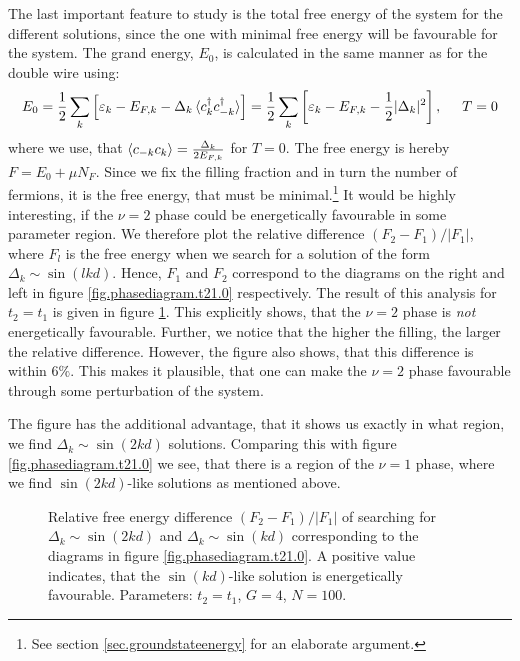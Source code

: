 The last important feature to study is the total free energy of the system for the different solutions, since the one with minimal free energy will be favourable for the system. The grand energy, $E_0$, is calculated in the same manner as for the double wire using:
\begin{equation}
E_0 = \frac{1}{2}\sum_k \left[\varepsilon_k - E_{F,k} - \Delta_k\braket{c^\dagger_{k}c^\dagger_{-k}}\right] = \frac{1}{2}\sum_k \left[\varepsilon_k - E_{F,k} - \frac{1}{2}|\Delta_k|^2\right], \hspace{0.5cm} T = 0
\label{eq.groundstategrandenergy.sumformula}
\end{equation}
where we use, that $\braket{c_{-k}c_k} = \frac{\Delta_k}{2E_{F,k}}$ for $T = 0$. The free energy is hereby $F = E_0 + \mu N_F$. Since we fix the filling fraction and in turn the number of fermions, it is the free energy, that must be minimal.\footnote{See section \ref{sec.groundstateenergy} for an elaborate argument.}  It would be highly interesting, if the $\nu = 2$ phase could be energetically favourable in some parameter region. We therefore plot the relative difference $(F_2 - F_1)/|F_1|$, where $F_l$ is the free energy when we search for a solution of the form $\Delta_k \sim \sin(lkd)$. Hence, $F_1$ and $F_2$ correspond to the diagrams on the right and left in figure \ref{fig.phasediagram.t21.0} respectively. The result of this analysis for $t_2 = t_1$ is given in figure \ref{fig.energydifference.t21.0}. This explicitly shows, that the $\nu = 2$ phase is \textit{not} energetically favourable. Further, we notice that the higher the filling, the larger the relative difference. However, the figure also shows, that this difference is within $6\%$. This makes it plausible, that one can make the $\nu = 2$ phase favourable through some perturbation of the system. 

The figure has the additional advantage, that it shows us exactly in what region, we find $\Delta_k \sim \sin(2kd)$ solutions. Comparing this with figure \ref{fig.phasediagram.t21.0} we see, that there is a region of the $\nu = 1$ phase, where we find $\sin(2kd)$-like solutions as mentioned above. 

\begin{figure}
\begin{center}

\caption{Relative free energy difference $(F_2 - F_1) / |F_1|$ of searching for $\Delta_k \sim \sin(2kd)$ and $\Delta_k\sim \sin(kd)$ corresponding to the diagrams in figure \ref{fig.phasediagram.t21.0}. A positive value indicates, that the $\sin(kd)$-like solution is energetically favourable. Parameters: $t_2 = t_1$, $G = 4$, $N = 100$. }
\label{fig.energydifference.t21.0}
\end{center}
\end{figure}
